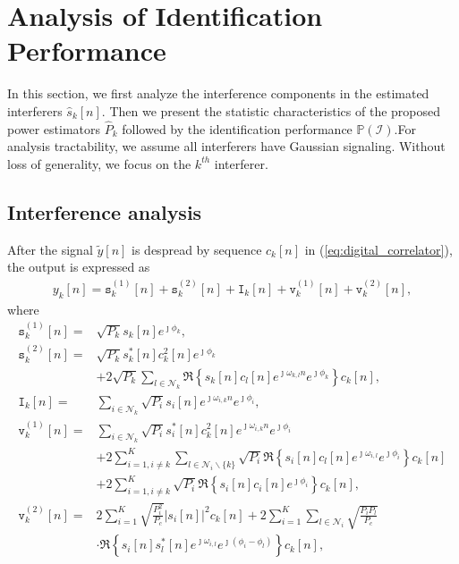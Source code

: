 \documentclass{IEEEtran}
\begin{document}
\section{Analysis of Identification Performance}
\label{sec:Theoretical}
In this section, we first analyze the interference components in the estimated interferers $\hat{s}_k[n]$. Then we present the statistic characteristics of the proposed power estimators $\hat{P}_k$ followed by the identification performance $\mathbb{P}(\mathcal{I})$.For analysis tractability, we assume all interferers have Gaussian signaling. Without loss of generality, we focus on the $k^{th}$ interferer.

\subsection{Interference analysis}
 After the signal $\tilde{y}[n]$ is despread by sequence $c_k[n]$ in (\ref{eq:digital_correlator}), the output is expressed as
 \newpage
\begin{align}
y_{k}[n] =\mathtt{s}^{(1)}_k[n]+\mathtt{s}^{(2)}_k[n]+ \mathtt{I}_k[n] +\mathtt{v}^{(1)}_k[n] +\mathtt{v}^{(2)}_k[n],
\label{eq:y_i_components}
\end{align}
where 
\begin{align}
\mathtt{s}^{(1)}_k[n] = &\sqrt{P_{k}}s_{k}[n]e^{\jmath\phi_{k}},\\
\mathtt{s}^{(2)}_k[n] = &\sqrt{P_{k}}s^*_{k}[n]c^2_k[n]e^{\jmath\phi_{k}}\nonumber\\
&+2\sqrt{P_{k}}\sum\limits_{l\in \mathcal{N}_k}\Re\left\{s_{k}[n]c_l[n]e^{\jmath\omega_{k,l}n}e^{\jmath\phi_{k}}\right\}c_k[n],\\
\mathtt{I}_k[n] = &\sum_{i\in \mathcal{N}_k}\sqrt{P_{i}}s_{i}[n]e^{\jmath\omega_{i,k}n}e^{\jmath\phi_{i}},\\
\mathtt{v}^{(1)}_k[n] = &\sum_{i\in \mathcal{N}_k}\sqrt{P_{i}}s^*_{i}[n]c^2_k[n]e^{\jmath\omega_{i,k}n}e^{\jmath\phi_{i}}\nonumber\\
&+2\sum\limits_{i=1,i\neq k}^{K}\sum\limits_{l\in \mathcal{N}_i\backslash\{k\}} \sqrt{P_{i}}\Re\left\{s_{i}[n]c_l[n]e^{\jmath\omega_{i,l}}e^{\jmath\phi_{i}}\right\}c_k[n]\nonumber\\
&+2\sum\limits_{i=1,i\neq k}^{K} \sqrt{P_{i}}\Re\left\{s_{i}[n]c_i[n]e^{\jmath\phi_{i}}\right\}c_k[n],\\
\mathtt{v}^{(2)}_k[n] = &2\sum\limits_{i=1}^{K}\sqrt{\frac{P_i^2}{P_c}}|s_i[n]|^2c_k[n] +2\sum\limits_{i=1}^{K}\sum\limits_{l\in \mathcal{N}_i} \sqrt{\frac{P_{i}P_l}{P_c}} \nonumber\\
&\cdot \Re\left\{ s_{i}[n]s^*_l[n] e^{\jmath\omega_{i,l}}e^{\jmath(\phi_{i}-\phi_{l})}\right\}c_k[n],
\end{align}
\end{document}
